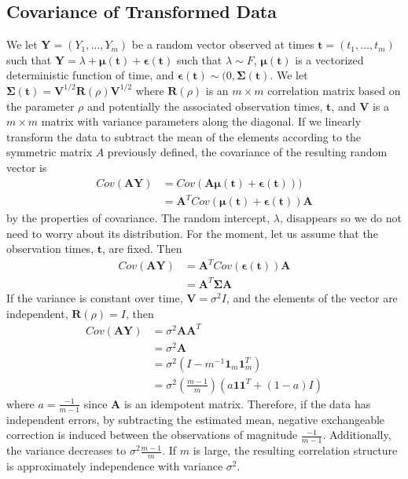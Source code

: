 \documentclass[12pt]{article}
\newcommand{\B}[0]{\mathbf}
\newcommand{\bs}[0]{\boldsymbol}
\begin{document}
\subsection{Covariance of Transformed Data}
We let $\B Y=(Y_{1},...,Y_{m})$ be a random vector observed at times $\B t=(t_{1},...,t_{m})$ such that
$\B Y = \lambda + \bs\mu(\B t) + \bs\epsilon(\B t)$
such that $\lambda\sim F$, $\bs\mu(\B t)$ is a vectorized deterministic function of time, and $\bs\epsilon(\B t)\sim(0,\bs\Sigma(\B t)$. We let $\B\Sigma(\B t) =\B V^{1/2}\B R(\rho)\B V^{1/2}$ where $\B R(\rho)$ is an $m\times m$ correlation matrix based on the parameter $\rho$ and potentially the associated observation times, $\B t$, and $\B V$ is a $m\times m$ matrix with variance parameters along the diagonal. If we linearly transform the data to subtract the mean of the elements according to the symmetric matrix $A$ previously defined, the covariance of the resulting random vector is
\begin{align*}
Cov(\B A\B Y) &= Cov(\B A\bs\mu(\B t)+\bs\epsilon(\B t)))\\
&= \B A^{T}Cov(\bs\mu(\B t)+\bs\epsilon(\B t))\B A
\end{align*}
by the properties of covariance. The random intercept, $\lambda$, disappears so we do not need to worry about its distribution. For the moment, let us assume that the observation times, $\B t$, are fixed. Then
\begin{align*}
Cov(\B A\B Y)&= \B A^{T}Cov(\bs\epsilon(\B t))\B A\\
&= \B A^{T}\B\Sigma \B A
\end{align*}
If the variance is constant over time, $\B V=\sigma^{2}I$, and the elements of the vector are independent, $\B R(\rho)=I$, then
\begin{align*} 
Cov(\B A\B Y) &= \sigma^{2}\B A\B A^{T} \\
&=\sigma^{2}\B A\\
&= \sigma^{2}(I - m^{-1}\B1_{m}\B1_{m}^{T})\\
&=\sigma^{2}\left(\frac{m-1}{m}\right)(a\B 1\B 1^{T}+ (1-a)I)
\end{align*}
 where $a=\frac{-1}{m-1}$ since $\B A$ is an idempotent matrix. Therefore, if the data has independent errors, by subtracting the estimated mean, negative exchangeable correction is induced between the observations of magnitude $\frac{-1}{m-1}$. Additionally, the variance decreases to $\sigma^{2}\frac{m-1}{m}$. If $m$ is large, the resulting correlation structure is approximately independence with variance $\sigma^{2}$.\\
 
\end{document}
